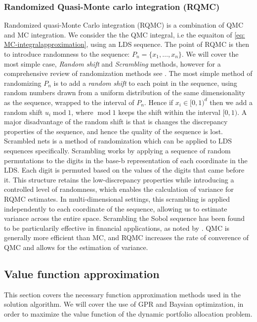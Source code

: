 \documentclass[11pt]{article}
\begin{document}
\subsubsection{Randomized Quasi-Monte carlo integration (RQMC)} \label{Subsection: RQMC}
Randomized quasi-Monte Carlo integration (RQMC) is a combination of \ac{QMC} and \ac{MC} integration.
We consider the the QMC integral, i.e the equaiton of \eqref{eq: MC-integralapproximation}, using an \ac{LDS} sequence.
The point of \ac{RQMC} is then to introduce randomness to the sequence: $P_{n} = \{ x_1 , \ldots , x_n \}$.
We will cover the most simple case, \textit{Random shift} and \textit{Scrambling} methods, however for a comprehensive review of randomization methods see \textcite{Glasserman2004MC}.
The most simple method of randomizing $P_n$ is to add a \textit{random shift} to each point in the sequence, using
random numbers drawn from a uniform distribution of the same dimensionality as the sequence, wrapped to the interval of $P_n$.
Hence if $x_{i} \in [0,1)^{d}$ then we add a random shift $u_{i} \operatorname{mod} 1$, where
$\operatorname{mod} 1$ keeps the shift within the interval $[0,1)$. 
A major disadvantage of the random shift is that is changes the discrepancy properties of the sequence,
and hence the quality of the sequence is lost.\\
Scrambled nets is a method of randomization which can be applied to \ac{LDS} sequences specifically.
Scrambling works by applying a sequence of random permutations to the 
digits in the base-b representation of each coordinate in the \ac{LDS}.
Each digit is permuted based on the values of the digits that came before it. 
This structure retains the low-discrepancy properties 
while introducing a controlled level of randomness, 
which enables the calculation of variance for RQMC estimates.
In multi-dimensional settings, this scrambling is applied independently to each coordinate of the sequence, allowing us to estimate variance across the entire space.
Scrambling the Sobol sequence has been found to be particularily effective in financial applications,
as noted by \textcite{Scramble2023}. QMC is generally more efficient than MC, and RQMC increases the rate of converence of QMC
and allows for the estimation of variance.  
\subsection{Value function approximation}
This section covers the necessary function approximation methods used in the solution algorithm.
We will cover the use of \ac{GPR} and Baysian optimization, in order to maximize the value function of the dynamic portfolio allocation problem. 
\end{document}
